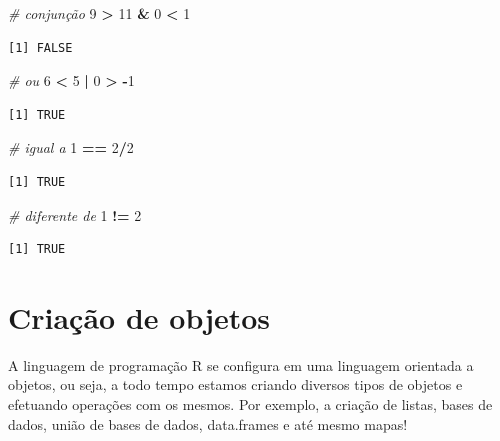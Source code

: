 \documentclass[12pt,portuguese,oneside]{book}
\newenvironment{Shaded}{\begin{snugshade}}{\end{snugshade}}
\newcommand{\DecValTok}[1]{\textcolor[rgb]{0.00,0.00,0.81}{#1}}
\newcommand{\StringTok}[1]{\textcolor[rgb]{0.31,0.60,0.02}{#1}}
\newcommand{\CommentTok}[1]{\textcolor[rgb]{0.56,0.35,0.01}{\textit{#1}}}
\newcommand{\OperatorTok}[1]{\textcolor[rgb]{0.81,0.36,0.00}{\textbf{#1}}}
\begin{document}
\begin{Shaded}
\begin{Highlighting}[]
\CommentTok{# conjunção}
\DecValTok{9} \OperatorTok{>}\StringTok{ }\DecValTok{11} \OperatorTok{&}\StringTok{ }\DecValTok{0} \OperatorTok{<}\StringTok{ }\DecValTok{1}
\end{Highlighting}
\end{Shaded}

\begin{verbatim}
[1] FALSE
\end{verbatim}

\begin{Shaded}
\begin{Highlighting}[]
\CommentTok{# ou}
\DecValTok{6} \OperatorTok{<}\StringTok{ }\DecValTok{5} \OperatorTok{|}\StringTok{ }\DecValTok{0} \OperatorTok{>}\StringTok{ }\OperatorTok{-}\DecValTok{1}
\end{Highlighting}
\end{Shaded}

\begin{verbatim}
[1] TRUE
\end{verbatim}

\begin{Shaded}
\begin{Highlighting}[]
\CommentTok{# igual a}
\DecValTok{1} \OperatorTok{==}\StringTok{ }\DecValTok{2}\OperatorTok{/}\DecValTok{2}
\end{Highlighting}
\end{Shaded}

\begin{verbatim}
[1] TRUE
\end{verbatim}

\begin{Shaded}
\begin{Highlighting}[]
\CommentTok{# diferente de}
\DecValTok{1} \OperatorTok{!=}\StringTok{ }\DecValTok{2}
\end{Highlighting}
\end{Shaded}

\begin{verbatim}
[1] TRUE
\end{verbatim}

\section{Criação de objetos}\label{criacao-de-objetos}

A linguagem de programação R se configura em uma linguagem orientada a
objetos, ou seja, a todo tempo estamos criando diversos tipos de objetos
e efetuando operações com os mesmos. Por exemplo, a criação de listas,
bases de dados, união de bases de dados, data.frames e até mesmo mapas!
\end{document}
